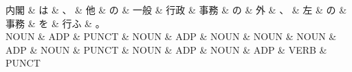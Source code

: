 \documentclass[tikz,border=5pt]{standalone}
\begin{document}
\normalsize
\begin{dependency}[edge unit distance=12.0pt]
    \begin{deptext}[column sep=1em]
        内閣 \& は \& 、 \& 他 \& の \& 一般 \& 行政 \& 事務 \& の \& 外 \& 、 \& 左 \& の \& 事務 \& を \& 行ふ \& 。\\
        NOUN \& ADP \& PUNCT \& NOUN \& ADP \& NOUN \& NOUN \& NOUN \& ADP \& NOUN \& PUNCT \& NOUN \& ADP \& NOUN \& ADP \& VERB \& PUNCT\\
    \end{deptext}
\end{dependency}
\end{document}
